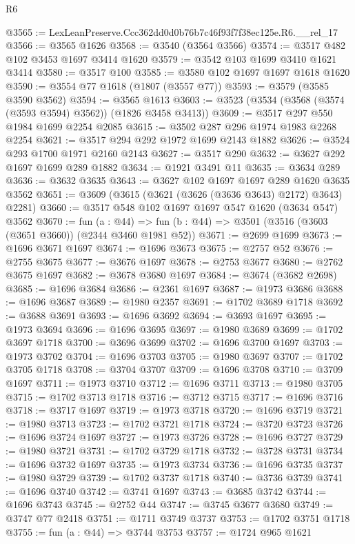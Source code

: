 \begin{lexlean}{R6}
\begin{coremodule}
@3565 := LexLeanPreserve.Ccc362dd0d0b76b7c46f93f7f38ec125e.R6.__rel_17
@3566 := @3565 @1626
@3568 := @3540 (@3564 @3566)
@3574 := @3517 @482 @102 @3453 @1697 @3414 @1620
@3579 := @3542 @103 @1699 @3410 @1621 @3414
@3580 := @3517 @100
@3585 := @3580 @102 @1697 @1697 @1618 @1620
@3590 := @3554 @77 @1618 (@1807 (@3557 @77))
@3593 := @3579 (@3585 @3590 @3562)
@3594 := @3565 @1613
@3603 := @3523 (@3534 (@3568 (@3574 (@3593 @3594) @3562)) (@1826 @3458 @3413))
@3609 := @3517 @297 @550 @1984 @1699 @2254 @2085
@3615 := @3502 @287 @296 @1974 @1983 @2268 @2254
@3621 := @3517 @294 @292 @1972 @1699 @2143 @1882
@3626 := @3524 @293 @1700 @1971 @2160 @2143
@3627 := @3517 @290
@3632 := @3627 @292 @1697 @1699 @289 @1882
@3634 := @1921 @3491 @11
@3635 := @3634 @289
@3636 := @3632 @3635
@3643 := @3627 @102 @1697 @1697 @289 @1620 @3635 @3562
@3651 := @3609 (@3615 (@3621 (@3626 (@3636 @3643) @2172) @3643) @2281)
@3660 := @3517 @548 @102 @1697 @1697 @547 @1620 (@3634 @547) @3562
@3670 := fun (a : @44) =>
  fun (b : @44) => @3501 (@3516 (@3603 (@3651 @3660)) (@2344 @3460 @1981 @52))
@3671 := @2699 @1699
@3673 := @1696 @3671 @1697
@3674 := @1696 @3673
@3675 := @2757 @52
@3676 := @2755 @3675
@3677 := @3676 @1697
@3678 := @2753 @3677
@3680 := @2762 @3675 @1697
@3682 := @3678 @3680 @1697
@3684 := @3674 (@3682 @2698)
@3685 := @1696 @3684
@3686 := @2361 @1697
@3687 := @1973 @3686
@3688 := @1696 @3687
@3689 := @1980 @2357
@3691 := @1702 @3689 @1718
@3692 := @3688 @3691
@3693 := @1696 @3692
@3694 := @3693 @1697
@3695 := @1973 @3694
@3696 := @1696 @3695
@3697 := @1980 @3689
@3699 := @1702 @3697 @1718
@3700 := @3696 @3699
@3702 := @1696 @3700 @1697
@3703 := @1973 @3702
@3704 := @1696 @3703
@3705 := @1980 @3697
@3707 := @1702 @3705 @1718
@3708 := @3704 @3707
@3709 := @1696 @3708
@3710 := @3709 @1697
@3711 := @1973 @3710
@3712 := @1696 @3711
@3713 := @1980 @3705
@3715 := @1702 @3713 @1718
@3716 := @3712 @3715
@3717 := @1696 @3716
@3718 := @3717 @1697
@3719 := @1973 @3718
@3720 := @1696 @3719
@3721 := @1980 @3713
@3723 := @1702 @3721 @1718
@3724 := @3720 @3723
@3726 := @1696 @3724 @1697
@3727 := @1973 @3726
@3728 := @1696 @3727
@3729 := @1980 @3721
@3731 := @1702 @3729 @1718
@3732 := @3728 @3731
@3734 := @1696 @3732 @1697
@3735 := @1973 @3734
@3736 := @1696 @3735
@3737 := @1980 @3729
@3739 := @1702 @3737 @1718
@3740 := @3736 @3739
@3741 := @1696 @3740
@3742 := @3741 @1697
@3743 := @3685 @3742
@3744 := @1696 @3743
@3745 := @2752 @44
@3747 := @3745 @3677 @3680
@3749 := @3747 @77 @2418
@3751 := @1711 @3749 @3737
@3753 := @1702 @3751 @1718
@3755 := fun (a : @44) => @3744 @3753
@3757 := @1724 @965 @1621

\end{coremodule}
\end{lexlean}
